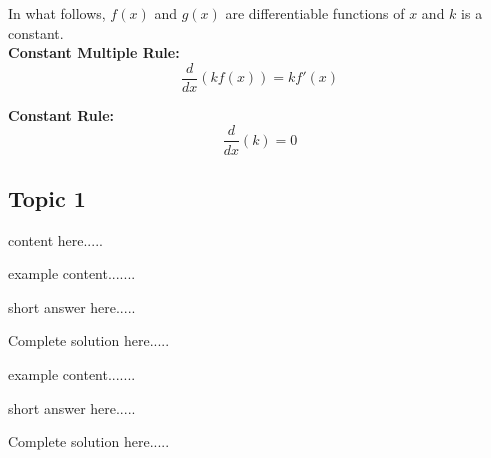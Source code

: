 \begin{tcolorbox}[title = {Formula Box}]

\noindent In what follows, $f(x)$ and $g(x)$ are differentiable functions of $x$ and $k$ is a constant.\\

\textbf{Constant Multiple Rule:}
\begin{equation}\label{eq:constantMultiple}
\frac{d}{dx}(kf(x))=kf'(x)
\end{equation}

\textbf{Constant Rule:}\footnotemark
\begin{equation}\label{eq:ConstantRule}
\frac{d}{dx}(k)=0
\end{equation}

\end{tcolorbox}
\subsection*{Topic 1}
content here.....
\begin{example}
example content.......
    \begin{sol}
    short answer here.....
    \end{sol}
    \begin{solL}
    Complete solution here.....
    
    \end{solL}
    
\end{example}
\vspace{0.6in}
\begin{example}
example content.......
    \begin{sol}
    short answer here.....
    \end{sol}
    \begin{solL}
    Complete solution here.....
    
    \end{solL}
    
\end{example}
\vspace{0.6in}
\vspace{2in}
